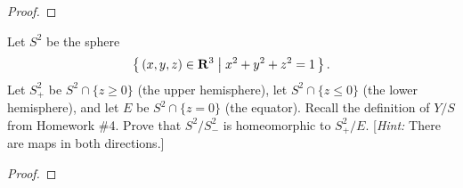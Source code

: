 \begin{proof}
\end{proof}
\newpage
\begin{problem}[B]
Let $S^2$ be the sphere
\[
\left\{\,(x,y,z)\in\mathbf{R}^3\;\middle|\;x^2+y^2+z^2=1\,\right\}.
\]
Let $S_+^2$ be $S^2\cap\{z\geq 0\}$ (the upper hemisphere), let
$S^2\cap\{z\leq 0\}$ (the lower hemisphere), and let $E$ be
$S^2\cap\{z=0\}$ (the equator). Recall the definition of $Y/S$
from Homework \#4. Prove that $S^2/S^2_-$ is homeomorphic to
$S_+^2/E$. [\emph{Hint:} There are maps in both directions.]
\end{problem}
\begin{proof}
\end{proof}

